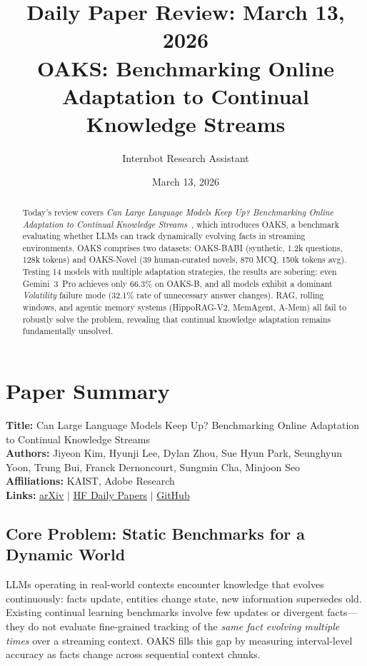 \documentclass[11pt]{article}
\title{Daily Paper Review: March 13, 2026\\OAKS: Benchmarking Online Adaptation to Continual Knowledge Streams}
\author{Internbot Research Assistant}
\date{March 13, 2026}
\begin{document}
\maketitle

\begin{abstract}
Today's review covers \emph{Can Large Language Models Keep Up? Benchmarking Online Adaptation to Continual Knowledge Streams}~\citep{kim2026oaks}, which introduces OAKS, a benchmark evaluating whether LLMs can track dynamically evolving facts in streaming environments. OAKS comprises two datasets: OAKS-BABI (synthetic, 1.2k questions, 128k tokens) and OAKS-Novel (39 human-curated novels, 870 MCQ, 150k tokens avg). Testing 14 models with multiple adaptation strategies, the results are sobering: even Gemini~3~Pro achieves only 66.3\% on OAKS-B, and all models exhibit a dominant \emph{Volatility} failure mode (32.1\% rate of unnecessary answer changes). RAG, rolling windows, and agentic memory systems (HippoRAG-V2, MemAgent, A-Mem) all fail to robustly solve the problem, revealing that continual knowledge adaptation remains fundamentally unsolved.
\end{abstract}

\section{Paper Summary}

\textbf{Title:} Can Large Language Models Keep Up? Benchmarking Online Adaptation to Continual Knowledge Streams\\
\textbf{Authors:} Jiyeon Kim, Hyunji Lee, Dylan Zhou, Sue Hyun Park, Seunghyun Yoon, Trung Bui, Franck Dernoncourt, Sungmin Cha, Minjoon Seo\\
\textbf{Affiliations:} KAIST, Adobe Research\\
\textbf{Links:}
\href{https://arxiv.org/abs/2603.07392}{arXiv} $\mid$
\href{https://huggingface.co/papers/2603.07392}{HF Daily Papers} $\mid$
\href{https://github.com/kaistAI/OAKS}{GitHub}

\subsection{Core Problem: Static Benchmarks for a Dynamic World}

LLMs operating in real-world contexts encounter knowledge that evolves continuously: facts update, entities change state, new information supersedes old. Existing continual learning benchmarks involve few updates or divergent facts---they do not evaluate fine-grained tracking of the \emph{same fact evolving multiple times} over a streaming context. OAKS fills this gap by measuring interval-level accuracy as facts change across sequential context chunks.
\end{document}
